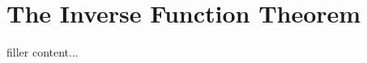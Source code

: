 \documentclass[../../templates/section]{subfiles}
\begin{document}
\section{The Inverse Function Theorem}\label{sec:the-inverse-function-theorem}

filler content...
\end{document}
